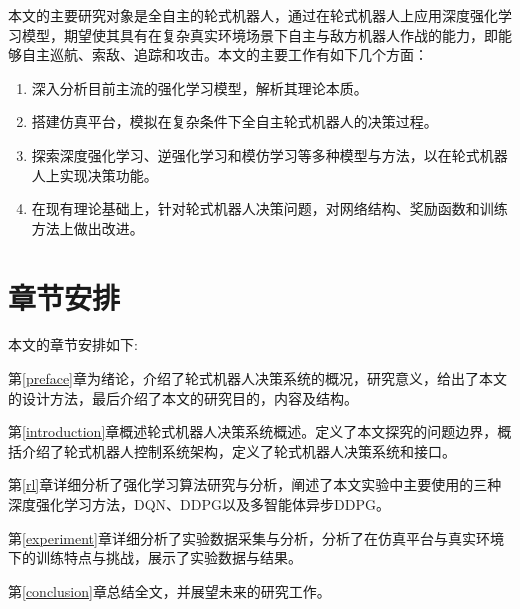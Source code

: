 本文的主要研究对象是全自主的轮式机器人，通过在轮式机器人上应用深度强化学习模型，期望使其具有在复杂真实环境场景下自主与敌方机器人作战的能力，即能够自主巡航、索敌、追踪和攻击。本文的主要工作有如下几个方面：
\vspace{-10pt}
\begin{enumerate}
	\item 深入分析目前主流的强化学习模型，解析其理论本质。
	\item 搭建仿真平台，模拟在复杂条件下全自主轮式机器人的决策过程。
	\item 探索深度强化学习、逆强化学习和模仿学习等多种模型与方法，以在轮式机器人上实现决策功能。
	\item 在现有理论基础上，针对轮式机器人决策问题，对网络结构、奖励函数和训练方法上做出改进。
\end{enumerate}

\section{章节安排}
本文的章节安排如下:

第\ref{preface}章为绪论，介绍了轮式机器人决策系统的概况，研究意义，给出了本文的设计方法，最后介绍了本文的研究目的，内容及结构。

第\ref{introduction}章概述轮式机器人决策系统概述。定义了本文探究的问题边界，概括介绍了轮式机器人控制系统架构，定义了轮式机器人决策系统和接口。

第\ref{rl}章详细分析了强化学习算法研究与分析，阐述了本文实验中主要使用的三种深度强化学习方法，DQN、DDPG以及多智能体异步DDPG。

第\ref{experiment}章详细分析了实验数据采集与分析，分析了在仿真平台与真实环境下的训练特点与挑战，展示了实验数据与结果。

第\ref{conclusion}章总结全文，并展望未来的研究工作。


